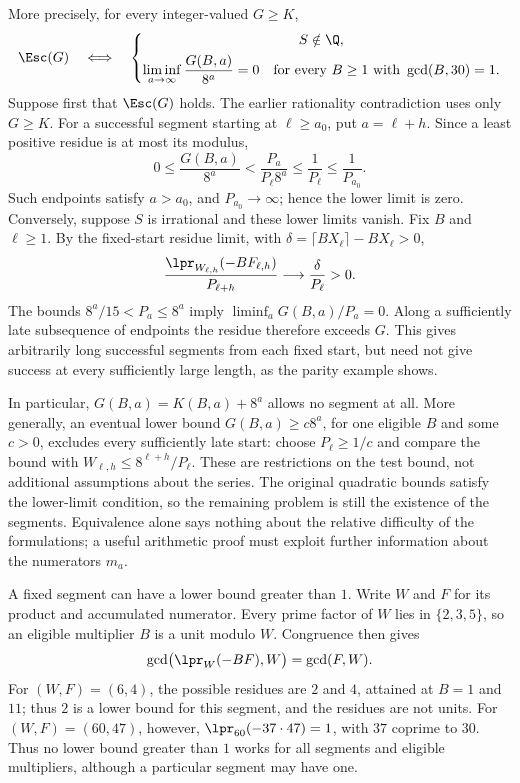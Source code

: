 More precisely, for every integer-valued $G\ge K$,
\[
 \Esc(G)\quad\Longleftrightarrow\quad
 \left\{\begin{gathered}
 S\notin\Q,\\
 \liminf_{a\to\infty}\frac{G(B,a)}{8^a}=0
 \quad\text{for every }B\ge1\text{ with }\gcd(B,30)=1.
 \end{gathered}\right.
\]
Suppose first that $\Esc(G)$
holds.  The earlier rationality contradiction uses only $G\ge K$.
For a successful segment starting at $\ell\ge a_0$, put $a=\ell+h$.
Since a least positive residue is at most its modulus,
\[
 0\le\frac{G(B,a)}{8^a}
 <\frac{P_a}{P_\ell8^a}\le\frac1{P_\ell}
 \le\frac1{P_{a_0}}.
\]
Such endpoints satisfy $a>a_0$, and $P_{a_0}\to\infty$; hence the
lower limit is zero.  Conversely, suppose $S$ is irrational and these
lower limits vanish.  Fix $B$ and $\ell\ge1$.  By the fixed-start
residue limit, with $\delta=\lceil BX_\ell\rceil-BX_\ell>0$,
\[
 \frac{\lpr_{W_{\ell,h}}(-BF_{\ell,h})}{P_{\ell+h}}
 \longrightarrow\frac{\delta}{P_\ell}>0.
\]
The bounds $8^a/15<P_a\le8^a$ imply
$\liminf_a G(B,a)/P_a=0$.  Along a sufficiently late subsequence of
endpoints the residue therefore exceeds $G$.  This gives arbitrarily
long successful segments from each fixed start, but need not give
success at every sufficiently large length, as the parity example shows.

In particular, $G(B,a)=K(B,a)+8^a$ allows no segment at all.  More
generally, an eventual lower bound $G(B,a)\ge c8^a$, for one eligible
$B$ and some $c>0$, excludes every sufficiently late start: choose
$P_\ell\ge1/c$ and compare the bound with $W_{\ell,h}\le8^{\ell+h}/P_\ell$.
These are restrictions on the test bound, not additional assumptions
about the series.  The original quadratic bounds satisfy the lower-limit
condition, so the remaining problem is still the existence of the
segments.  Equivalence alone says nothing about the relative difficulty
of the formulations; a useful arithmetic proof must exploit further
information about the numerators $m_a$.

A fixed segment can have a lower bound greater than $1$.  Write $W$ and
$F$ for its product and accumulated numerator.  Every prime factor of
$W$ lies in $\{2,3,5\}$, so an eligible multiplier $B$ is a unit modulo
$W$.  Congruence then gives
\[
 \gcd\bigl(\lpr_W(-BF),W\bigr)=\gcd(F,W).
\]
For $(W,F)=(6,4)$, the possible residues are $2$ and $4$, attained at
$B=1$ and $11$; thus $2$ is a lower bound for this segment, and the residues
are not units.  For $(W,F)=(60,47)$, however,
$\lpr_{60}(-37\cdot47)=1$, with $37$ coprime to $30$.
Thus no lower bound greater than $1$ works for all segments and eligible
multipliers, although a particular segment may have one.

